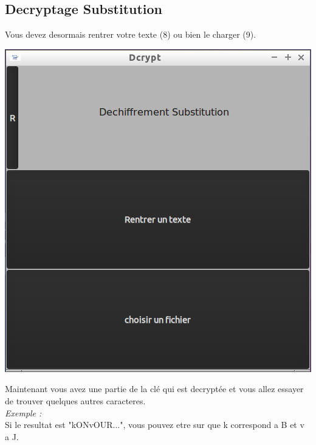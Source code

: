 \documentclass[a4]{article}
\begin{document}
		\subsection{Decryptage Substitution}
			Vous devez desormais rentrer votre texte (8) ou bien le charger (9).
			\begin{center}\includegraphics[scale=0.4]{10.png}\end{center}
			Maintenant vous avez une partie de la clé qui est decryptée et vous allez 
 			essayer de trouver quelques autres caracteres. \\
 			\textit{Exemple :}\\
 			Si le resultat est "kONvOUR...", vous pouvez etre sur que k correspond a B et v a J. 
\end{document}
